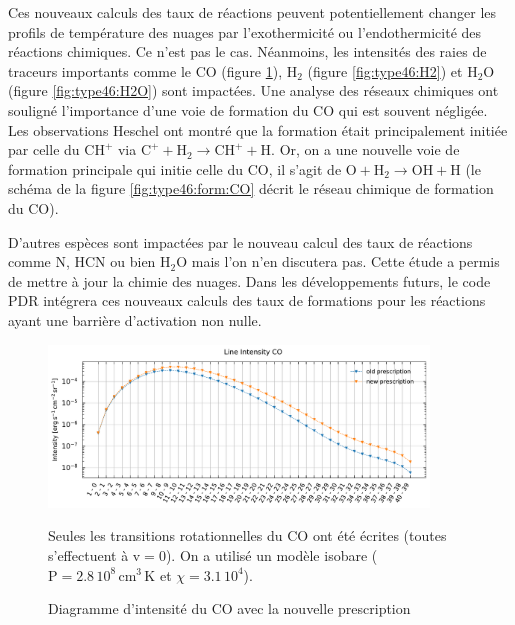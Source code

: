 Ces nouveaux calculs des taux de réactions peuvent potentiellement changer les profils de température des nuages par l'exothermicité ou l'endothermicité des réactions chimiques. Ce n'est pas le cas. Néanmoins, les intensités des raies de traceurs importants comme le $\mathrm{CO}$ (figure \ref{fig:type46:CO}), $\mathrm{H}_2$ (figure \ref{fig:type46:H2}) et $\mathrm{H}_2\mathrm{O}$ (figure \ref{fig:type46:H2O}) sont impactées. Une analyse des réseaux chimiques ont souligné l'importance d'une voie de formation du $\mathrm{CO}$ qui est souvent négligée. Les observations Heschel ont montré que la formation  était principalement initiée par celle du $\mathrm{CH}^+$ via $\mathrm{C}^+ + \mathrm{H}_2 \rightarrow \mathrm{CH}^+ + \mathrm{H}$. Or, on a une nouvelle voie de formation principale qui initie celle du $\mathrm{CO}$, il s'agit de $\mathrm{O} + \mathrm{H}_2 \rightarrow \mathrm{OH} + \mathrm{H}$ (le schéma de la figure \ref{fig:type46:form:CO} décrit le réseau chimique de formation du $\mathrm{CO}$). \newline 


D'autres espèces sont impactées par le nouveau calcul des taux de réactions comme $\mathrm{N}$, $\mathrm{HCN}$ ou bien $\mathrm{H}_2\mathrm{O}$ mais l'on n'en discutera pas. Cette étude a permis de mettre à jour la chimie des nuages. Dans les développements futurs, le code PDR intégrera ces nouveaux calculs des taux de formations pour les réactions ayant une barrière d'activation non nulle. 


\begin{figure}[!h]
    \centering \includegraphics[trim = {0 0 0 1cm},clip,width=0.9\textwidth]{figure/type46/I_comp_CO.pdf}
    \caption{Diagramme d'intensité du $\mathrm{CO}$ avec la nouvelle prescription}
    \begin{minipage}{\textwidth}
    Seules les transitions rotationnelles du $\mathrm{CO}$ ont été écrites (toutes s'effectuent à $\mathrm{v}=0$). On a utilisé un modèle isobare ($\mathrm{P} = 2.8\,10^{8} \,\mathrm{cm}^3\,\mathrm{K}$ et $\chi = 3.1\, 10^4$).
    \end{minipage}
    \label{fig:type46:CO}
\end{figure}


